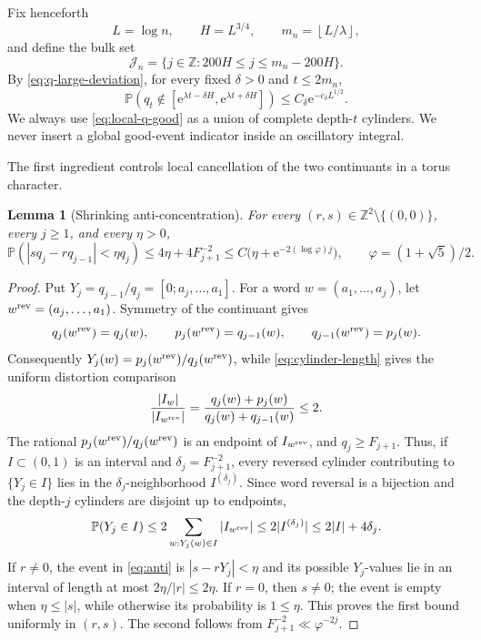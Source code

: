 \documentclass[11pt,a4paper]{amsart}
\newtheorem{lemma}[theorem]{Lemma}
\theoremstyle{definition}
\theoremstyle{remark}
\newcommand{\Z}{\mathbb Z}
\newcommand{\Pp}{\mathbb P}
\newcommand{\e}{\mathrm e}
\begin{document}
Fix henceforth
\begin{equation}\label{eq:scales}
 L=\log n,\qquad H=L^{3/4},\qquad
 m_n=\left\lfloor L/\lambda\right\rfloor,
\end{equation}
and define the bulk set
\begin{equation}\label{eq:bulk}
 \mathcal J_n=\{j\in\Z:200H\le j\le m_n-200H\}.
\end{equation}
By \eqref{eq:q-large-deviation}, for every fixed $\delta>0$ and
$t\le2m_n$,
\begin{equation}\label{eq:local-q-good}
 \Pp(q_t\notin[\e^{\lambda t-\delta H},
                    \e^{\lambda t+\delta H}])
 \le C_\delta \e^{-c_\delta L^{1/2}}.
\end{equation}
We always use \eqref{eq:local-q-good} as a union of complete depth-$t$
cylinders.  We never insert a global good-event indicator inside an
oscillatory integral.

The first ingredient controls local cancellation of the two continuants in a
torus character.

\begin{lemma}[Shrinking anti-concentration]\label{lem:anti}
For every $(r,s)\in\Z^2\setminus\{(0,0)\}$, every $j\ge1$, and every
$\eta>0$,
\begin{equation}\label{eq:anti}
 \Pp(|sq_j-rq_{j-1}|<\eta q_j)
 \le 4\eta+4F_{j+1}^{-2}
 \le C\bigl(\eta+\e^{-2(\log\varphi)j}\bigr),
 \qquad \varphi=(1+\sqrt5)/2.
\end{equation}
\end{lemma}

\begin{proof}
Put $Y_j=q_{j-1}/q_j=[0;a_j,\ldots,a_1]$.  For a word
$w=(a_1,\ldots,a_j)$, let $w^{\rm rev}=(a_j,\ldots,a_1)$.  Symmetry of the
continuant gives
\[
 q_j(w^{\rm rev})=q_j(w),
 \qquad p_j(w^{\rm rev})=q_{j-1}(w),
 \qquad q_{j-1}(w^{\rm rev})=p_j(w).
\]
Consequently $Y_j(w)=p_j(w^{\rm rev})/q_j(w^{\rm rev})$, while
\eqref{eq:cylinder-length} gives the uniform distortion comparison
\[
 \frac{|I_w|}{|I_{w^{\rm rev}}|}
 =\frac{q_j(w)+p_j(w)}{q_j(w)+q_{j-1}(w)}\le2.
\]
The rational $p_j(w^{\rm rev})/q_j(w^{\rm rev})$ is an endpoint of
$I_{w^{\rm rev}}$, and $q_j\ge F_{j+1}$.  Thus, if $I\subset(0,1)$ is an
interval and $\delta_j=F_{j+1}^{-2}$, every reversed cylinder contributing to
$\{Y_j\in I\}$ lies in the $\delta_j$-neighborhood $I^{(\delta_j)}$.  Since
word reversal is a bijection and the depth-$j$ cylinders are disjoint up to
endpoints,
\[
 \Pp(Y_j\in I)
 \le2\sum_{w:Y_j(w)\in I}|I_{w^{\rm rev}}|
 \le2|I^{(\delta_j)}|
 \le2|I|+4\delta_j.
\]
If $r\ne0$, the event in \eqref{eq:anti} is $|s-rY_j|<\eta$ and its possible
$Y_j$-values lie in an interval of length at most $2\eta/|r|\le2\eta$.
If $r=0$, then $s\ne0$; the event is empty when $\eta\le|s|$, while otherwise
its probability is $1\le\eta$.  This proves the first bound uniformly in
$(r,s)$.  The second follows from $F_{j+1}^{-2}\ll\varphi^{-2j}$.
\end{proof}
\end{document}
